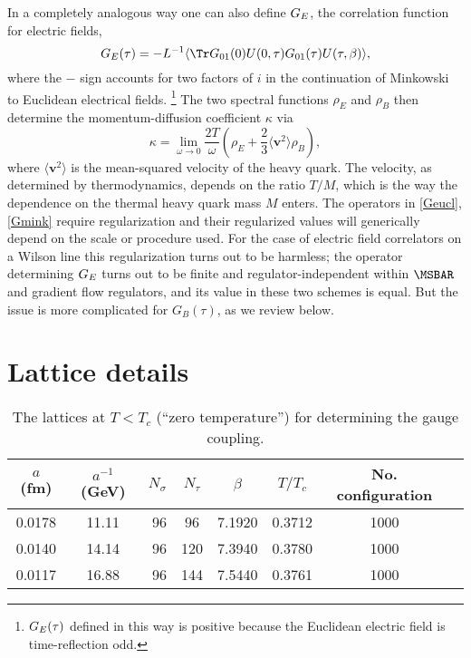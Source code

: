 \documentclass[floatfix,twocolumn,prd,showpacs,preprintnumbers,amsmath,nofootinbib,amssymb,superscriptaddress]{revtex4-2}
\begin{document}
In a completely analogous way one can also define $G_E$, the correlation function for electric fields,
\begin{equation}
\label{GEdef}
    \GE(\tau) = -L^{-1} \langle \Tr G_{01}(0) U(0,\tau) G_{01}(\tau) U(\tau,\beta) \rangle,
\end{equation}
where the $-$ sign accounts for two factors of $i$ in the continuation of Minkowski to Euclidean electrical fields.%
\footnote{$G_E(\tau)$ defined in this way is positive because the Euclidean electric field is time-reflection odd.}
The two spectral functions $\rho_E$ and $\rho_B$ then determine the momentum-diffusion coefficient $\kappa$ via
\begin{equation}
\label{kappa}
    \kappa = \lim_{\omega \to 0} \frac{2T}{\omega}
    \left( \rho_E + \frac{2}{3} \langle \mathbf{v}^2 \rangle \rho_B \right),
\end{equation}
where $\langle \mathbf{v}^2 \rangle$ is the mean-squared velocity of the heavy quark. The velocity, as determined by thermodynamics, depends on the ratio $T/M$, which is the way the dependence on the thermal heavy quark mass $M$ enters.
The operators in \cref{Geucl}, \cref{Gmink} require regularization and their regularized values will generically depend on the scale or procedure used.
For the case of electric field correlators on a Wilson line this regularization turns out to be harmless;
the operator determining $G_E$ turns out to be finite and regulator-independent within $\MSBAR$ and gradient flow regulators, and its value in these two schemes is equal.
But the issue is more complicated for $G_B(\tau)$, as we review below.

\section{Lattice details}
\label{sec:latt}



\begin{table}[t]       
    \centering
    \begin{tabular}{ccrccccc}                            
    \hline \hline
    $a$ (fm) & $a^{-1}$ (GeV) & $N_{\sigma}$ & $N_{\tau}$ & $\beta$ & $T/T_{c}$ & No. configuration\tabularnewline
    \hline
    0.0178 & 11.11 & 96 & 96  & 7.1920 &  0.3712  & 1000 \tabularnewline
    0.0140 & 14.14 & 96 & 120  & 7.3940 &  0.3780  & 1000 \tabularnewline
    0.0117 & 16.88 & 96 & 144  & 7.5440 &  0.3761  & 1000 \tabularnewline
    \hline \hline
    \end{tabular}
    \caption{ The lattices at $T<T_c$ (``zero temperature'') for determining the gauge coupling.
    }
    \label{tab_zeroT}
\end{table}
\end{document}
